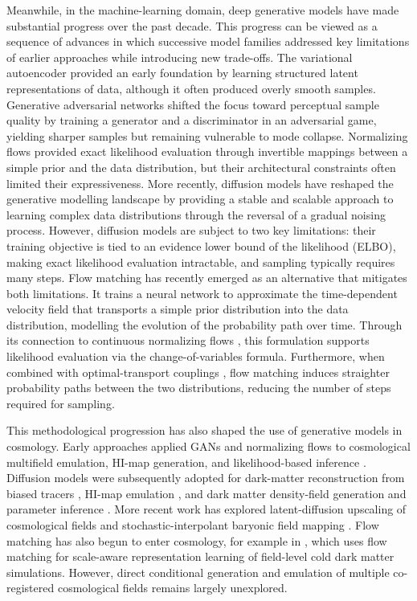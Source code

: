 \documentclass[usenatbib]{mnras}
\begin{document}
Meanwhile, in the machine-learning domain, deep generative models
have made substantial progress over the past decade. This progress
can be viewed as a sequence of advances in which successive model
families addressed key limitations of earlier approaches while
introducing new trade-offs. The variational autoencoder \citep[VAE;][]{Kingma2014} 
provided an early foundation by learning structured latent representations of
data, although it often produced overly smooth samples. Generative adversarial networks
\citep[GANs;][]{Goodfellow2014} shifted the focus toward perceptual
sample quality by training a generator and a discriminator in an
adversarial game, yielding sharper samples but
remaining vulnerable to mode collapse. Normalizing flows \citep{RezendeMohamed2015}
provided exact likelihood evaluation through invertible mappings
between a simple prior and the data distribution, but their
architectural constraints often limited their expressiveness.
More recently, diffusion models \citep{Ho2020,Song2021} have reshaped the generative modelling 
landscape by providing a stable and scalable approach to learning complex data
distributions through the reversal of a gradual noising process. 
However, diffusion models are subject to two key limitations: 
their training objective is tied to an evidence lower bound of the likelihood (ELBO), 
making exact likelihood evaluation intractable, and sampling typically requires many steps.
Flow matching \citep{Lipman2023} has recently emerged as an
alternative that mitigates both limitations. It trains a
neural network to approximate the time-dependent velocity field that
transports a simple prior distribution into the data distribution,
modelling the evolution of the probability path over time. Through
its connection to continuous normalizing flows \citep{Chen2018}, this
formulation supports likelihood evaluation via the
change-of-variables formula. Furthermore, when combined with
optimal-transport couplings \citep{Lipman2023}, flow matching induces
straighter probability paths between the two distributions, reducing
the number of steps required for sampling.

This methodological progression has also shaped the use of generative
models in cosmology. Early approaches applied GANs and normalizing
flows to cosmological multifield emulation, HI-map generation, and
likelihood-based inference
\citep{Andrianomena2022,Andrianomena2024,Hassan2021HIFlow,Friedman2022HIGlow}.
Diffusion models were subsequently adopted for dark-matter
reconstruction from biased tracers
\citep{Park2023Diffusion,Ono2024Debiasing}, HI-map emulation
\citep{Hassan2023HIDM}, and dark matter density-field generation and
parameter inference \citep{Mudur2024,Mudur2024DiffHMC}. More recent
work has explored latent-diffusion upscaling of cosmological fields
\citep{Mishra2026} and stochastic-interpolant baryonic field mapping
\citep{Horowitz2025}. Flow matching has also begun to enter cosmology, for example in
\citet{Kannan2025}, which uses flow matching for scale-aware
representation learning of field-level cold dark matter simulations.
However, direct conditional generation and emulation of multiple
co-registered cosmological fields remains largely unexplored.
\end{document}
